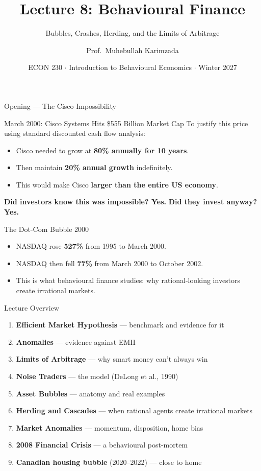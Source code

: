 \documentclass[aspectratio=169]{beamer}
\title{\textbf{Lecture 8: Behavioural Finance}}
\subtitle{Bubbles, Crashes, Herding, and the Limits of Arbitrage}
\author{Prof.\ Muhebullah Karimzada}
\institute{School of Economics, University of Northern British Columbia}
\date{ECON 230 $\cdot$ Introduction to Behavioural Economics $\cdot$ Winter 2027}
\begin{document}
\begin{frame}[plain]\titlepage\end{frame}

\begin{frame}{Opening --- The Cisco Impossibility}
\begin{alertblock}{March 2000: Cisco Systems Hits \$555 Billion Market Cap}
To justify this price using standard discounted cash flow analysis:
\begin{itemize}
  \item Cisco needed to grow at \textbf{80\% annually for 10 years}.
  \item Then maintain \textbf{20\% annual growth} indefinitely.
  \item This would make Cisco \textbf{larger than the entire US economy}.
\end{itemize}
\textbf{Did investors know this was impossible? Yes.} \textbf{Did they invest anyway? Yes.}
\end{alertblock}
\begin{block}{The Dot-Com Bubble 2000}
\begin{itemize}
  \item NASDAQ rose \textbf{527\%} from 1995 to March 2000.
  \item NASDAQ then fell \textbf{77\%} from March 2000 to October 2002.
  \item This is what behavioural finance studies: why rational-looking investors create irrational markets.
\end{itemize}
\end{block}
\end{frame}

\begin{frame}{Lecture Overview}
\begin{enumerate}[<+->]
  \item \textbf{Efficient Market Hypothesis} --- benchmark and evidence for it
  \item \textbf{Anomalies} --- evidence against EMH
  \item \textbf{Limits of Arbitrage} --- why smart money can't always win
  \item \textbf{Noise Traders} --- the model (DeLong et al., 1990)
  \item \textbf{Asset Bubbles} --- anatomy and real examples
  \item \textbf{Herding and Cascades} --- when rational agents create irrational markets
  \item \textbf{Market Anomalies} --- momentum, disposition, home bias
  \item \textbf{2008 Financial Crisis} --- a behavioural post-mortem
  \item \textbf{Canadian housing bubble} (2020--2022) --- close to home
\end{enumerate}
\end{frame}
\end{document}
